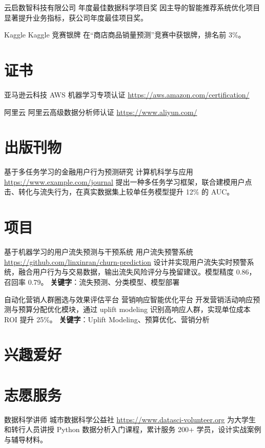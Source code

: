 \documentclass[a4paper, serif, 10pt]{moderncv}
\begin{document}
        {云启数智科技有限公司}
        {年度最佳数据科学项目奖}
        {}
        {}
        {因主导的智能推荐系统优化项目显著提升业务指标，获公司年度最佳项目奖。}

        {Kaggle}
        {Kaggle 竞赛银牌}
        {}
        {}
        {在“商店商品销量预测”竞赛中获银牌，排名前 3\%。}
\section{证书}

        {亚马逊云科技}
        {AWS 机器学习专项认证}
        {\url{https://aws.amazon.com/certification/}}
        {}
        {}

        {阿里云}
        {阿里云高级数据分析师认证}
        {\url{https://www.aliyun.com/}}
        {}
        {}
\section{出版刊物}

        {基于多任务学习的金融用户行为预测研究}
        {计算机科学与应用}
        {\url{https://www.example.com/journal}}
        {}
        {提出一种多任务学习框架，联合建模用户点击、转化与流失行为，在真实数据集上较单任务模型提升 12\% 的 AUC。}
\section{项目}

        {基于机器学习的用户流失预测与干预系统}
        {用户流失预警系统}
        {\url{https://github.com/linxinran/churn-prediction}}
        {}
        {设计并实现用户流失实时预警系统，融合用户行为与交易数据，输出流失风险评分与挽留建议。模型精度 0.86，召回率 0.79。
\textbf{关键字}：流失预测、分类模型、模型部署}

        {自动化营销人群圈选与效果评估平台}
        {营销响应智能优化平台}
        {}
        {}
        {开发营销活动响应预测与预算分配优化模块，通过 uplift modeling 识别高响应人群，实现单位成本 ROI 提升 25\%。
\textbf{关键字}：Uplift Modeling、预算优化、营销分析}
\section{兴趣爱好}

\section{志愿服务}

        {数据科学讲师}
        {城市数据科学公益社}
        {\url{https://www.datasci-volunteer.org}}
        {}
        {为大学生和转行人员讲授 Python 数据分析入门课程，累计服务 200+ 学员，设计实战案例与辅导材料。}
    
\end{document}
